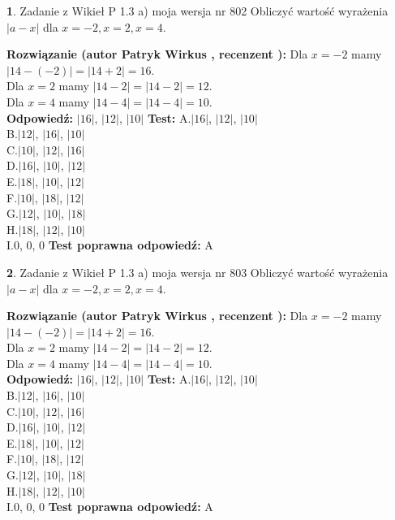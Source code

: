 \documentclass[12pt, a4paper]{article}
\theoremstyle{definition} %
\newtheorem{zad}{}
\newcommand{\zadStart}[1]{\begin{zad}#1\newline}
\newcommand{\zadStop}{\end{zad}}
\newcommand{\rozwStart}[2]{\noindent \textbf{Rozwiązanie (autor #1 , recenzent #2): }\newline}
\newcommand{\rozwStop}{\newline}
\newcommand{\odpStart}{\noindent \textbf{Odpowiedź:}\newline}
\newcommand{\odpStop}{\newline}
\newcommand{\testStart}{\noindent \textbf{Test:}\newline}
\newcommand{\testStop}{\newline}
\newcommand{\kluczStart}{\noindent \textbf{Test poprawna odpowiedź:}\newline}
\newcommand{\kluczStop}{\newline}
\begin{document}
\zadStart{Zadanie z Wikieł P 1.3 a) moja wersja nr 802}
Obliczyć wartość wyrażenia $|a - x|$ dla $x=-2,x=2,x=4$.
\zadStop
\rozwStart{Patryk Wirkus}{}
Dla $x = -2$ mamy $|14 - (-2)| = |14 + 2| = 16$.\\
Dla $x = 2$ mamy $|14 - 2| = |14 - 2| = 12$.\\
Dla $x = 4$ mamy $|14 - 4| = |14 - 4| = 10$.\\
\rozwStop
\odpStart
$|16|$, $|12|$, $|10|$
\odpStop
\testStart
A.$|16|$, $|12|$, $|10|$\\
B.$|12|$, $|16|$, $|10|$\\
C.$|10|$, $|12|$, $|16|$\\
D.$|16|$, $|10|$, $|12|$\\
E.$|18|$, $|10|$, $|12|$\\
F.$|10|$, $|18|$, $|12|$\\
G.$|12|$, $|10|$, $|18|$\\
H.$|18|$, $|12|$, $|10|$\\
I.$0$, $0$, $0$
\testStop
\kluczStart
A
\kluczStop



\zadStart{Zadanie z Wikieł P 1.3 a) moja wersja nr 803}
Obliczyć wartość wyrażenia $|a - x|$ dla $x=-2,x=2,x=4$.
\zadStop
\rozwStart{Patryk Wirkus}{}
Dla $x = -2$ mamy $|14 - (-2)| = |14 + 2| = 16$.\\
Dla $x = 2$ mamy $|14 - 2| = |14 - 2| = 12$.\\
Dla $x = 4$ mamy $|14 - 4| = |14 - 4| = 10$.\\
\rozwStop
\odpStart
$|16|$, $|12|$, $|10|$
\odpStop
\testStart
A.$|16|$, $|12|$, $|10|$\\
B.$|12|$, $|16|$, $|10|$\\
C.$|10|$, $|12|$, $|16|$\\
D.$|16|$, $|10|$, $|12|$\\
E.$|18|$, $|10|$, $|12|$\\
F.$|10|$, $|18|$, $|12|$\\
G.$|12|$, $|10|$, $|18|$\\
H.$|18|$, $|12|$, $|10|$\\
I.$0$, $0$, $0$
\testStop
\kluczStart
A
\kluczStop
\end{document}

